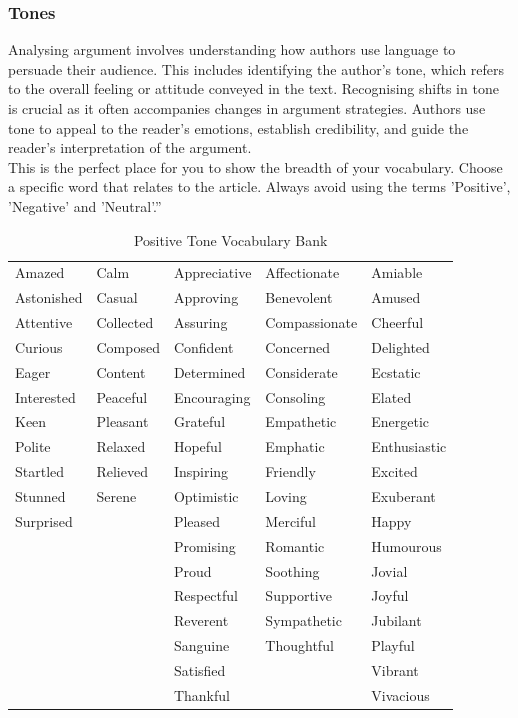 \documentclass[a4paper]{article}
\begin{document}
\subsubsection{Tones}
Analysing argument involves understanding how authors use language to persuade their audience. This includes identifying the author's tone, which refers to the overall feeling or attitude conveyed in the text. Recognising shifts in tone is crucial as it often accompanies changes in argument strategies. Authors use tone to appeal to the reader's emotions, establish credibility, and guide the reader's interpretation of the argument.\\

This is the perfect place for you to show the breadth of your vocabulary. Choose a specific word that relates to the article. Always avoid using the terms 'Positive', 'Negative' and 'Neutral'.''

\begin{longtable}{|p{2cm}|p{2cm}|p{2cm}|p{2cm}|p{2cm}|}
\caption{Positive Tone Vocabulary Bank} \label{tab:positivetonewords} \\
\hline
\hline
\endfirsthead

\hline
\hline
\endhead

\hline
\endfoot

Amazed & Calm & Appreciative & Affectionate & Amiable \\
Astonished & Casual & Approving & Benevolent & Amused \\
Attentive & Collected & Assuring & Compassionate & Cheerful \\
Curious & Composed & Confident & Concerned & Delighted \\
Eager & Content & Determined & Considerate & Ecstatic \\
Interested & Peaceful & Encouraging & Consoling & Elated \\
Keen & Pleasant & Grateful & Empathetic & Energetic \\
Polite & Relaxed & Hopeful & Emphatic & Enthusiastic \\
Startled & Relieved & Inspiring & Friendly & Excited \\
Stunned & Serene & Optimistic & Loving & Exuberant \\
Surprised &  & Pleased & Merciful & Happy \\
 &  & Promising & Romantic & Humourous \\
 &  & Proud & Soothing & Jovial \\
 &  & Respectful & Supportive & Joyful \\
 &  & Reverent & Sympathetic & Jubilant \\
 &  & Sanguine & Thoughtful & Playful \\
 &  & Satisfied &  & Vibrant \\
 &  & Thankful &  & Vivacious \\
\hline

\end{longtable}
\end{document}
